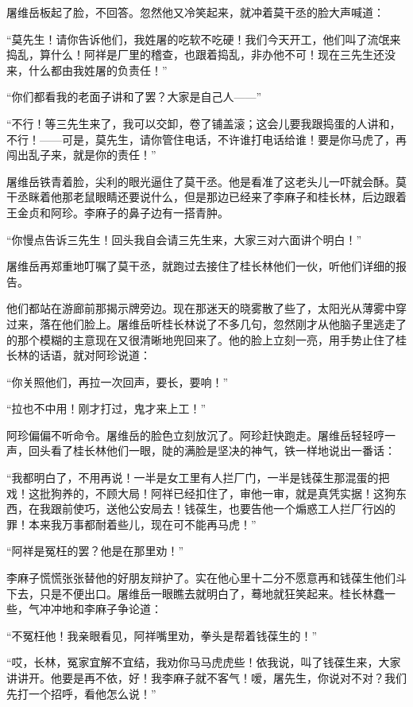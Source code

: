 \par 屠维岳板起了脸，不回答。忽然他又冷笑起来，就冲着莫干丞的脸大声喊道：
\par “莫先生！请你告诉他们，我姓屠的吃软不吃硬！我们今天开工，他们叫了流氓来捣乱，算什么！阿祥是厂里的稽查，也跟着捣乱，非办他不可！现在三先生还没来，什么都由我姓屠的负责任！”
\par “你们都看我的老面子讲和了罢？大家是自己人——”
\par “不行！等三先生来了，我可以交卸，卷了铺盖滚；这会儿要我跟捣蛋的人讲和，不行！——可是，莫先生，请你管住电话，不许谁打电话给谁！要是你马虎了，再闯出乱子来，就是你的责任！”
\par 屠维岳铁青着脸，尖利的眼光逼住了莫干丞。他是看准了这老头儿一吓就会酥。莫干丞眯着他那老鼠眼睛还要说什么，但是那边已经来了李麻子和桂长林，后边跟着王金贞和阿珍。李麻子的鼻子边有一搭青肿。
\par “你慢点告诉三先生！回头我自会请三先生来，大家三对六面讲个明白！”
\par 屠维岳再郑重地叮嘱了莫干丞，就跑过去接住了桂长林他们一伙，听他们详细的报告。
\par 他们都站在游廊前那揭示牌旁边。现在那迷天的晓雾散了些了，太阳光从薄雾中穿过来，落在他们脸上。屠维岳听桂长林说了不多几句，忽然刚才从他脑子里逃走了的那个模糊的主意现在又很清晰地兜回来了。他的脸上立刻一亮，用手势止住了桂长林的话语，就对阿珍说道：
\par “你关照他们，再拉一次回声，要长，要响！”
\par “拉也不中用！刚才打过，鬼才来上工！”
\par 阿珍偏偏不听命令。屠维岳的脸色立刻放沉了。阿珍赶快跑走。屠维岳轻轻哼一声，回头看了桂长林他们一眼，陡的满脸是坚决的神气，铁一样地说出一番话：
\par “我都明白了，不用再说！一半是女工里有人拦厂门，一半是钱葆生那混蛋的把戏！这批狗养的，不顾大局！阿祥已经扣住了，审他一审，就是真凭实据！这狗东西，在我跟前使巧，送他公安局去！钱葆生，也要告他一个煽惑工人拦厂行凶的罪！本来我万事都耐着些儿，现在可不能再马虎！”
\par “阿祥是冤枉的罢？他是在那里劝！”
\par 李麻子慌慌张张替他的好朋友辩护了。实在他心里十二分不愿意再和钱葆生他们斗下去，只是不便出口。屠维岳一眼瞧去就明白了，蓦地就狂笑起来。桂长林蠢一些，气冲冲地和李麻子争论道：
\par “不冤枉他！我亲眼看见，阿祥嘴里劝，拳头是帮着钱葆生的！”
\par “哎，长林，冤家宜解不宜结，我劝你马马虎虎些！依我说，叫了钱葆生来，大家讲讲开。他要是再不依，好！我李麻子就不客气！嗳，屠先生，你说对不对？我们先打一个招呼，看他怎么说！”
